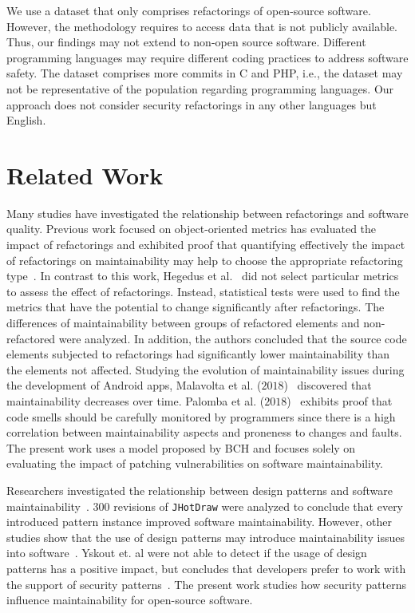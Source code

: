 \documentclass[sigconf,review]{acmart}
\begin{document}
We use a dataset that only comprises refactorings of open-source software.
However, the methodology requires to access data that is not publicly available.
Thus, our findings may not extend to non-open source software. Different programming 
languages may require different coding practices to address software safety. The 
dataset comprises more commits in C and PHP, i.e., the dataset may not be representative 
of the population regarding programming languages. Our approach does not consider 
security refactorings in any other languages but English.

\section{Related Work}\label{sec:rw}

Many studies have investigated the relationship between refactorings and
software quality. Previous work focused on object-oriented metrics has evaluated the
impact of refactorings and exhibited proof that quantifying effectively the
impact of refactorings on maintainability may help to choose the appropriate
refactoring type~\cite{1167822}. In contrast to this work, Hegedus et
al.~\cite{HEGEDUS2018313} did not select particular metrics to assess the effect
of refactorings. Instead, statistical tests were used to find the metrics that
have the potential to change significantly after refactorings. The differences
of maintainability between groups of refactored elements and non-refactored were
analyzed. In addition, the authors concluded that the source code elements
subjected to refactorings had significantly lower maintainability than the
elements not affected. Studying the evolution of maintainability issues during
the development of Android apps, Malavolta et al. ($2018$)~\cite{8530041}
discovered that maintainability decreases over time. Palomba et al.
($2018$)~\cite{Palomba:2018:DIM:3231288.3231337} exhibits proof that code smells
should be carefully monitored by programmers since there is a high correlation
between maintainability aspects and proneness to changes and faults. The present
work uses a model proposed by BCH and focuses solely on evaluating the impact of
patching vulnerabilities on software maintainability.

Researchers investigated the relationship between design patterns and software
maintainability~\cite{10.1007/978-3-642-35267-6-18}. $300$ revisions of
\texttt{JHotDraw} were analyzed to conclude that every introduced pattern
instance improved software maintainability. However, other studies show that the
use of design patterns may introduce maintainability issues into
software~\cite{4493325}. Yskout et. al were not able to detect if the usage of design patterns has a positive impact, but concludes that developers prefer to work with the support of security patterns~\cite{8077802}. The present work studies how security patterns influence maintainability for open-source software.
\end{document}
